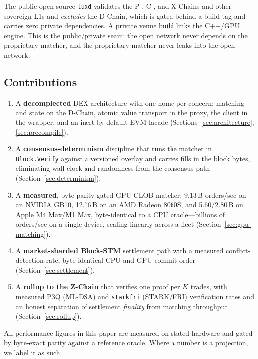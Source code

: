The public open-source \texttt{luxd} validates the P-, C-, and X-Chains and other
sovereign L1s and \emph{excludes} the D-Chain, which is gated behind a build tag and
carries zero private dependencies. A private venue build links the C++/GPU engine.
This is the public/private seam: the open network never depends on the proprietary
matcher, and the proprietary matcher never leaks into the open network.

\subsection{Contributions}

\begin{enumerate}
  \item A \textbf{decomplected} DEX architecture with one home per concern: matching
  and state on the D-Chain, atomic value transport in the proxy, the client in the
  wrapper, and an inert-by-default EVM facade (Sections~\ref{sec:architecture},
  \ref{sec:precompile}).
  \item A \textbf{consensus-determinism} discipline that runs the matcher in
  \texttt{Block.Verify} against a versioned overlay and carries fills in the block
  bytes, eliminating wall-clock and randomness from the consensus path
  (Section~\ref{sec:determinism}).
  \item A \textbf{measured}, byte-parity-gated GPU CLOB matcher: 9.13\,B orders/sec on
  an NVIDIA GB10, 12.76\,B on an AMD Radeon 8060S, and 5.60/2.80\,B on Apple M4 Max/M1 Max,
  byte-identical to a CPU oracle---billions of orders/sec on a single device, scaling
  linearly across a fleet (Section~\ref{sec:gpu-matching}).
  \item A \textbf{market-sharded Block-STM} settlement path with a measured
  conflict-detection rate, byte-identical CPU and GPU commit order
  (Section~\ref{sec:settlement}).
  \item A \textbf{rollup to the Z-Chain} that verifies one proof per $K$ trades, with
  measured P3Q (ML-DSA) and \texttt{starkfri} (STARK/FRI) verification rates and an
  honest separation of settlement \emph{finality} from matching throughput
  (Section~\ref{sec:rollup}).
\end{enumerate}

All performance figures in this paper are measured on stated hardware and gated by
byte-exact parity against a reference oracle. Where a number is a projection, we label
it as such.
